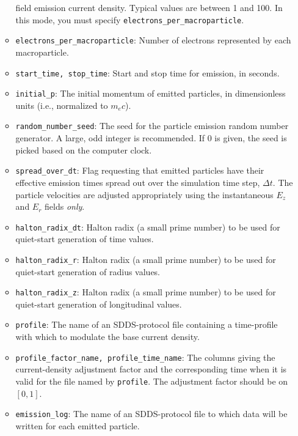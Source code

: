 \begin{itemize}
\begin{itemize}
        field emission current density.  Typical values are between 1 and 100.
        In this mode, you must specify {\tt electrons\_per\_macroparticle}.
    \item {\tt electrons\_per\_macroparticle}: Number of electrons represented by
        each macroparticle.  
    \item {\tt start\_time, stop\_time}: Start and stop time for emission, in seconds.
    \item {\tt initial\_p}:  The initial momentum of emitted
        particles, in dimensionless units (i.e., normalized to $m_e c$).
    \item {\tt random\_number\_seed}:  The seed for the particle emission random number
        generator.  A large, odd integer is recommended.  If 0 is given, the seed is picked based
        on the computer clock.
    \item {\tt spread\_over\_dt}: Flag requesting that emitted particles have their effective 
        emission times spread out over the simulation time step, $\Delta t$.  The particle velocities
        are adjusted appropriately using the instantaneous $E_z$ and $E_r$ fields {\em only}.
    \item {\tt halton\_radix\_dt}: Halton radix (a small prime number) to be used for quiet-start
      generation of time values.
    \item {\tt halton\_radix\_r}: Halton radix (a small prime number) to be used for quiet-start
      generation of radius values.
    \item {\tt halton\_radix\_z}: Halton radix (a small prime number) to be used for quiet-start
      generation of longitudinal values.
    \item {\tt profile}: The name of an SDDS-protocol file containing a time-profile with which
        to modulate the base current density. 
    \item {\tt profile\_factor\_name, profile\_time\_name}: The columns giving the current-density
        adjustment factor and the corresponding time when it is valid for the file named by
        {\tt profile}.  The adjustment factor should be on $[0, 1]$.
    \item {\tt emission\_log}: The name of an SDDS-protocol file to which data will be written for
      each emitted particle.
\end{itemize}

\end{itemize}
